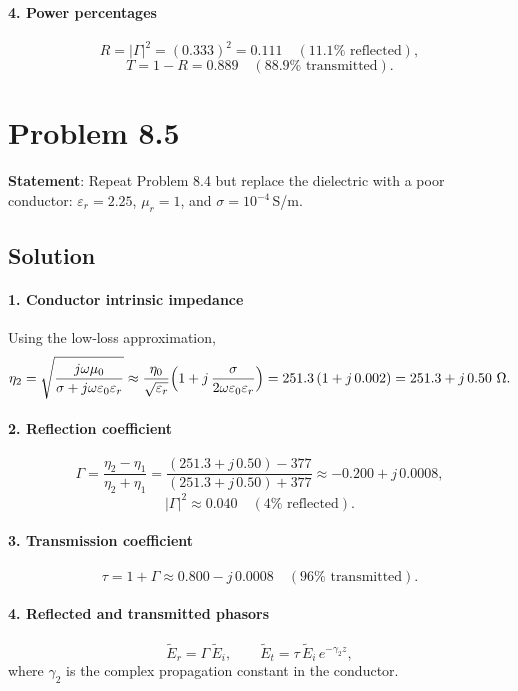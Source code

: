 \paragraph{4. Power percentages}
\[
R = |\Gamma|^2 = (0.333)^2 = 0.111\quad(11.1\%\text{ reflected}),
\]
\[
T = 1 - R = 0.889\quad(88.9\%\text{ transmitted}).
\]

\section*{Problem 8.5}
\textbf{Statement}: Repeat Problem 8.4 but replace the dielectric with a poor conductor: $\varepsilon_r=2.25$, $\mu_r=1$, and $\sigma=10^{-4}\,$S/m.

\subsection*{Solution}

\paragraph{1. Conductor intrinsic impedance}
Using the low‐loss approximation,
\[
\eta_2 = \sqrt{\frac{j\omega\mu_0}{\sigma + j\omega\varepsilon_0\varepsilon_r}}
\approx \frac{\eta_0}{\sqrt{\varepsilon_r}}
\Bigl(1 + j\,\frac{\sigma}{2\omega\varepsilon_0\varepsilon_r}\Bigr)
= 251.3\,(1 + j\,0.002)
= 251.3 + j\,0.50\ \Omega.
\]

\paragraph{2. Reflection coefficient}
\[
\Gamma = \frac{\eta_2 - \eta_1}{\eta_2 + \eta_1}
       = \frac{(251.3 + j\,0.50) - 377}{(251.3 + j\,0.50) + 377}
       \approx -0.200 + j\,0.0008,
\]
\[
|\Gamma|^2 \approx 0.040 \quad(4\%\text{ reflected}).
\]

\paragraph{3. Transmission coefficient}
\[
\tau = 1 + \Gamma \approx 0.800 - j\,0.0008 \quad(96\%\text{ transmitted}).
\]

\paragraph{4. Reflected and transmitted phasors}
\[
\tilde E_r = \Gamma\,\tilde E_i,
\qquad
\tilde E_t = \tau\,\tilde E_i\,e^{-\gamma_2 z},
\]
where $\gamma_2$ is the complex propagation constant in the conductor.

